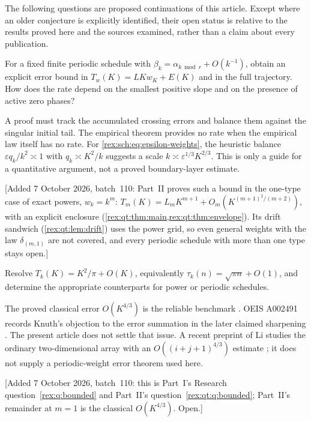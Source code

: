 The following questions are proposed continuations of this article.
Except where an older conjecture is explicitly identified, their
open status is relative to the results proved here and the sources
examined, rather than a claim about every publication.

\begin{question}\label{rex:sch:q:quant}
For a fixed finite periodic schedule with
$\beta_k=\alpha_{k\bmod r}+O(k^{-1})$, obtain an explicit
error bound in $T_w(K)=LK w_K+E(K)$ and in the full trajectory.
How does the rate depend on the smallest positive slope and on
the presence of active zero phases?
\end{question}

A proof must track the accumulated crossing errors and balance
them against the singular initial tail. The empirical theorem
provides no rate when the empirical law itself has no rate.
For \eqref{rex:sch:eq:epsilon-weights}, the heuristic balance
$\varepsilon q_k/k^2\asymp1$ with $q_k\asymp K^2/k$ suggests
a scale $k\asymp\varepsilon^{1/3}K^{2/3}$. This is only a guide
for a quantitative argument, not a proved boundary-layer estimate.

[Added 7 October 2026, batch~110: Part~II proves such a bound in the
one-type case of exact powers, $w_k=k^m$:
$T_m(K)=L_mK^{m+1}+O_m(K^{(m+1)^2/(m+2)})$, with an explicit enclosure
(\cref{rex:qt:thm:main,rex:qt:thm:envelope}). Its drift sandwich
(\cref{rex:qt:lem:drift}) uses the power grid, so even general weights with
the law $\delta_{(m,1)}$ are not covered, and every periodic schedule with
more than one type stays open.]

\begin{question}\label{rex:sch:q:classical}
Resolve $T_{k}(K)=K^2/\pi+O(K)$, equivalently
$\tau_k(n)=\sqrt{\pi n}+O(1)$, and determine the appropriate
counterparts for power or periodic schedules.
\end{question}

The proved classical error $O(K^{4/3})$ is the reliable benchmark
\cite{erdos-jabotinsky}. OEIS A002491 records Knuth's objection to the error
summation in the later claimed sharpening \cite{oeis-threshold}.
The present article does not settle that issue. A recent preprint
of Li studies the ordinary two-dimensional array with an
$O((i+j+1)^{4/3})$ estimate \cite{li}; it does not supply a
periodic-weight error theorem used here.

[Added 7 October 2026, batch~110: this is Part~I's Research
question~\ref{rex:q:bounded} and Part~II's question~\ref{rex:qt:q:bounded};
Part~II's remainder at $m=1$ is the classical $O(K^{4/3})$. Open.]

